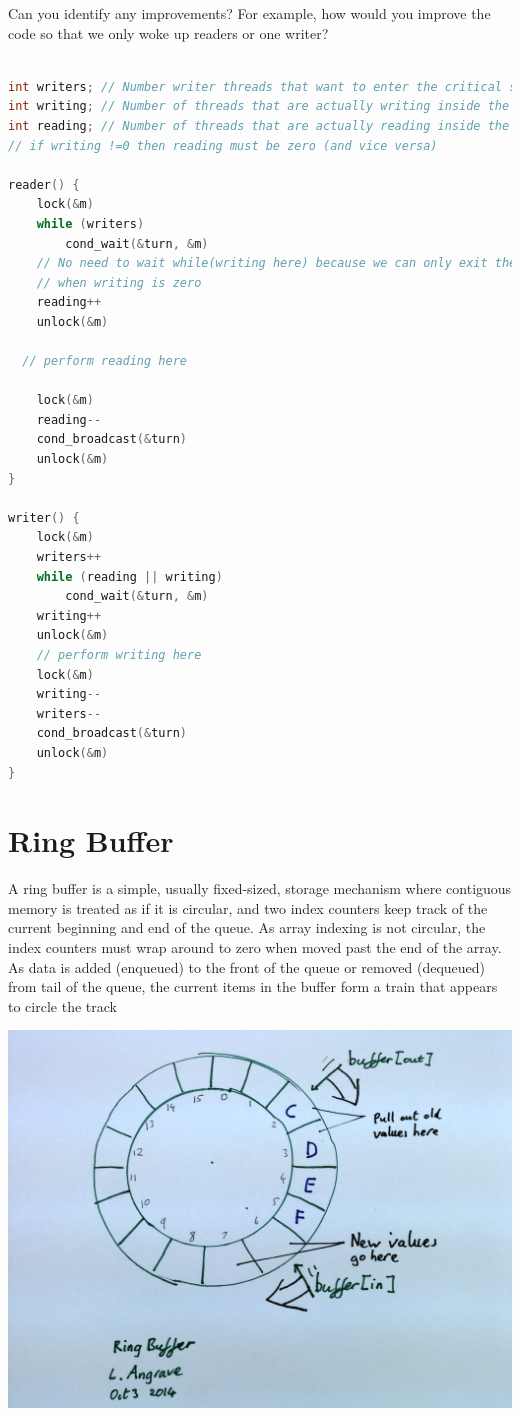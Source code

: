 Can you identify any improvements?
For example, how would you improve the code so that we only woke up readers or one writer?

\begin{lstlisting}[language=C]

int writers; // Number writer threads that want to enter the critical section (some or all of these may be blocked)
int writing; // Number of threads that are actually writing inside the C.S. (can only be zero or one)
int reading; // Number of threads that are actually reading inside the C.S.
// if writing !=0 then reading must be zero (and vice versa)

reader() {
    lock(&m)
    while (writers)
        cond_wait(&turn, &m)
    // No need to wait while(writing here) because we can only exit the above loop
    // when writing is zero
    reading++
    unlock(&m)

  // perform reading here

    lock(&m)
    reading--
    cond_broadcast(&turn)
    unlock(&m)
}

writer() {
    lock(&m)
    writers++
    while (reading || writing)
        cond_wait(&turn, &m)
    writing++
    unlock(&m)
    // perform writing here
    lock(&m)
    writing--
    writers--
    cond_broadcast(&turn)
    unlock(&m)
}
\end{lstlisting}

\section{Ring Buffer}

A ring buffer is a simple, usually fixed-sized, storage mechanism where contiguous memory is treated as if it is circular, and two index counters keep track of the current beginning and end of the queue.
As array indexing is not circular, the index counters must wrap around to zero when moved past the end of the array.
As data is added (enqueued) to the front of the queue or removed (dequeued) from tail of the queue, the current items in the buffer form a train that appears to circle the track

\begin{center}
\includegraphics[width=.5\textwidth]{synchronization/images/ring_buffer.png}
\end{center}


